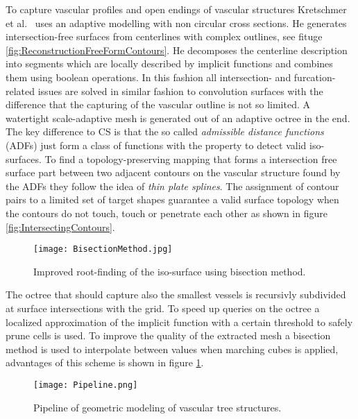 To capture vascular profiles and open endings of vascular structures Kretschmer et al.~\cite{kretschmer2012reliable} uses an adaptive modelling with non circular cross sections. He generates intersection-free surfaces from centerlines with complex outlines, see fituge \ref{fig:ReconstructionFreeFormContours}. He decomposes the centerline description into segments which are locally described by implicit functions and combines them using boolean operations. In this fashion all intersection- and furcation-related issues are solved in similar fashion to convolution surfaces with the difference that the capturing of the vascular outline is not so limited. A watertight scale-adaptive mesh is generated out of an adaptive octree in the end. The key difference to CS is that the so called \emph{admissible distance functions} (ADFs) just form a class of functions with the property to detect valid iso-surfaces. To find a topology-preserving mapping that forms a intersection free surface part between two adjacent contours on the vascular structure found by the ADFs they follow the idea of \emph{thin plate splines}. The assignment of contour pairs to a limited set of target shapes guarantee a valid surface topology when the contours do not touch, touch or penetrate each other as shown in figure \ref{fig:IntersectingContours}.

\begin{figure}[h]
	\centering
	\texttt{[image: BisectionMethod.jpg]} \\
	\caption{Improved root-finding of the iso-surface using bisection method.}
	\cite{kretschmer2012reliable}
	\label{fig:BisectionMethod}
\end{figure} 

The octree that should capture also the smallest vessels is recursivly subdivided at surface intersections with the grid. To speed up queries on the octree a localized approximation of the implicit function with a certain threshold to safely prune cells is used.
To improve the quality of the extracted mesh a bisection method is used to interpolate between values when marching cubes is applied, advantages of this scheme is shown in figure \ref{fig:BisectionMethod}.

\begin{figure}[h]
	\centering
	\texttt{[image: Pipeline.png]} \\
	\caption{Pipeline of geometric modeling of vascular tree structures.}
	\cite{wu2010scale}
	\label{fig:Pipeline}
\end{figure} 

